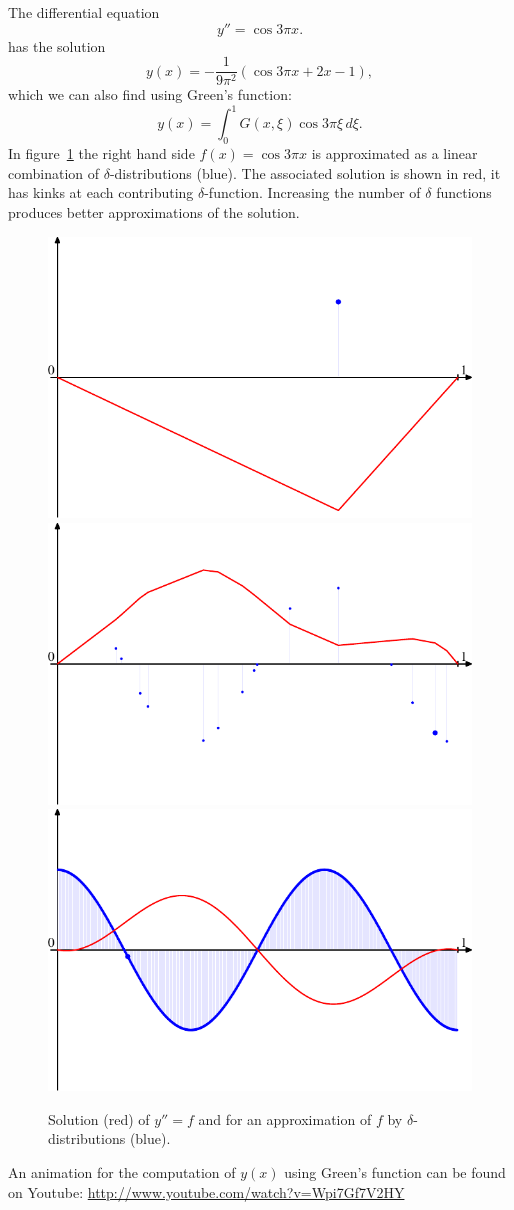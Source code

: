 \begin{beispiel}
The differential equation
\[
y''=\cos 3\pi x.
\]
has the solution
\[
y(x)=-\frac1{9\pi^2}(\cos 3\pi x + 2x - 1),
\]
which we can also find using Green's function:
\[
y(x)=\int_0^1 G(x,\xi)\cos 3\pi\xi\,d\xi.
\]
In figure~\ref{elliptisch:green-beispiele}
the right hand side $f(x)=\cos 3\pi x$ is approximated as a linear
combination of $\delta$-distributions (blue).
The associated solution is shown in red, it has kinks at each 
contributing $\delta$-function.
Increasing the number of $\delta$ functions produces better approximations
of the solution.
\begin{figure}
\begin{center}
\includegraphics[width=0.7\hsize]{../common/graphics/green-1.pdf}\\
\includegraphics[width=0.7\hsize]{../common/graphics/green-324.pdf}\\
\includegraphics[width=0.7\hsize]{../common/graphics/green-1082.pdf}
\end{center}
\caption{Solution (red) of $y''=f$ and for an approximation of $f$ by
$\delta$-distributions (blue).
\label{elliptisch:green-beispiele}}
\end{figure}

An animation for the computation of $y(x)$ using Green's function
can be found on Youtube:
\url{http://www.youtube.com/watch?v=Wpi7Gf7V2HY}
\end{beispiel}

